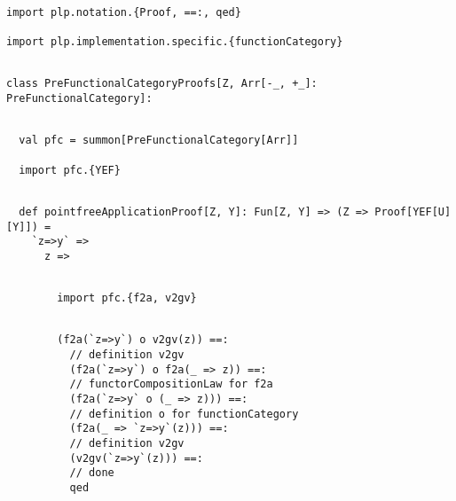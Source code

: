 \documentclass[11pt]{article}
\begin{document}
\vspace{6pt}
\begin{mdframed}[backgroundcolor=lightgray!20] 
\begin{lstlisting}

import plp.notation.{Proof, ==:, qed}

import plp.implementation.specific.{functionCategory}
\end{lstlisting}
\end{mdframed}
\vspace{6pt}
\begin{mdframed}[backgroundcolor=lightgray!20] 
\begin{lstlisting}

class PreFunctionalCategoryProofs[Z, Arr[-_, +_]: PreFunctionalCategory]:
\end{lstlisting}
\end{mdframed}    
\vspace{6pt}
\begin{mdframed}[backgroundcolor=lightgray!20] 
\begin{lstlisting}

  val pfc = summon[PreFunctionalCategory[Arr]]

  import pfc.{YEF}
\end{lstlisting}
\end{mdframed}    
\vspace{6pt}
\begin{mdframed}[backgroundcolor=lightgray!20] 
\begin{lstlisting}

  def pointfreeApplicationProof[Z, Y]: Fun[Z, Y] => (Z => Proof[YEF[U][Y]]) =
    `z=>y` =>
      z =>
\end{lstlisting}
\end{mdframed}
\vspace{6pt}
\begin{mdframed}[backgroundcolor=lightgray!20] 
\begin{lstlisting}

        import pfc.{f2a, v2gv}
\end{lstlisting}
\end{mdframed}   
\clearpage 
\vspace{6pt}
\begin{mdframed}[backgroundcolor=lightgray!20] 
\begin{lstlisting}
        
        (f2a(`z=>y`) o v2gv(z)) ==:
          // definition v2gv
          (f2a(`z=>y`) o f2a(_ => z)) ==:
          // functorCompositionLaw for f2a
          (f2a(`z=>y` o (_ => z))) ==:
          // definition o for functionCategory
          (f2a(_ => `z=>y`(z))) ==:
          // definition v2gv
          (v2gv(`z=>y`(z))) ==:
          // done
          qed
\end{lstlisting}
\end{mdframed}    
\end{document}
